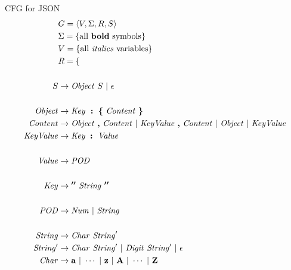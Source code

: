 \documentclass{article}
\begin{document}
CFG for JSON
\begin{align*}
	                    & G                    = \langle V, \Sigma, R, S \rangle               \\
	                    & \Sigma               = \{ \text{all \textbf{bold} symbols} \}        \\
	                    & V                    = \{ \text{all \textit{italics} variables} \}   \\
	                    & R                    = \{                                            \\
	\\
	S                   & \rightarrow \mathit{Object} ~ S ~|~ \epsilon                         \\
	\\
	\mathit{Object}     & \rightarrow \mathit{Key} ~ \boldsymbol{:} ~ \boldsymbol{\{} ~
	\mathit{Content} ~ \boldsymbol{\}}                                                         \\
	\mathit{Content}    & \rightarrow \mathit{Object} ~ \boldsymbol{,} ~ \mathit{Content} ~|~
	\mathit{KeyValue} ~ \boldsymbol{,} ~ \mathit{Content} ~|~
	\mathit{Object} ~|~ \mathit{KeyValue}                                                      \\
	\mathit{KeyValue}   & \rightarrow \textit{Key} ~ \boldsymbol{:} ~ \textit{Value}           \\
	\\
	\mathit{Value}      & \rightarrow \mathit{POD}                                             \\
	\\
	\mathit{Key}        & \rightarrow \boldsymbol{''} ~ \mathit{String} ~ \boldsymbol{''}      \\
	\\
	\mathit{POD}        & \rightarrow \mathit{Num} ~|~ \mathit{String}                         \\
	\\
	\mathit{String}     & \rightarrow \mathit{Char} ~ \mathit{String}'                         \\
	\mathit{String}'    & \rightarrow \mathit{Char} ~ \mathit{String}' ~|~
	\mathit{Digit} ~ \mathit{String}' ~|~ \epsilon                                             \\
	\mathit{Char}       & \rightarrow \mathbf{a} ~|~ \cdots ~|~ \mathbf{z} ~|~
	\mathbf{A} ~|~ \cdots ~|~ \mathbf{Z}                                                       \\

\end{align*}
\end{document}
